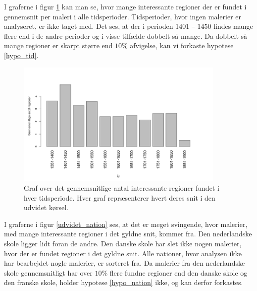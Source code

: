 {I graferne i figur \ref{udvidet_year} kan man se, hvor mange
interessante regioner der er fundet i gennemsnit per maleri i alle
tidsperioder.  Tidsperioder, hvor ingen malerier er analyseret, er ikke
taget med. Det ses, at der i perioden 1401 -- 1450 findes mange flere
end i de andre perioder og i visse tilfælde dobbelt så mange. Da
dobbelt så mange regioner er skarpt større end $10\%$ afvigelse, kan vi
forkaste hypotese \ref{hypo_tid}.

\begin{figure}[!h]
	\begin{center}
		\includegraphics[angle=0,width=0.90\textwidth]{afsnit/resultater/billeder/yearcutU.png}
	\end{center}
    \caption{Graf over det gennemsnitlige antal interessante regioner
    fundet i hver tidsperiode. Hver graf repræsenterer hvert deres snit
    i den udvidet kørsel.}
	\label{udvidet_year}
\end{figure}

I graferne i figur \ref{udvidet_nation} ses, at det er meget svingende,
hvor malerier, med mange interessante regioner i det gyldne snit, kommer
fra. Den nederlandske skole ligger lidt foran de andre. Den danske skole har slet ikke
nogen malerier, hvor der er fundet regioner i det gyldne snit. Alle
nationer, hvor analysen ikke har bearbejdet nogle malerier, er sorteret
fra. Da malerier fra den nederlandske skole gennemsnitligt har over
$10\%$ flere fundne regioner end den danske skole og den franske
skole, holder hypotese
\ref{hypo_nation} ikke, og kan derfor forkastes.

}
